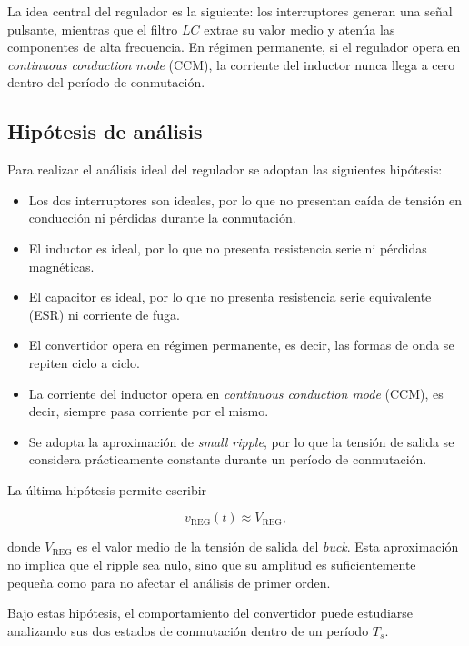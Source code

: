 \documentclass[a4paper,12pt]{article}
\begin{document}
La idea central del regulador es la siguiente: los interruptores generan una señal pulsante, mientras que el filtro $LC$ extrae su valor medio y atenúa las componentes de alta frecuencia. En régimen permanente, si el regulador opera en \textit{continuous conduction mode} (CCM), la corriente del inductor nunca llega a cero dentro del período de conmutación.

\subsection{Hipótesis de análisis}

Para realizar el análisis ideal del regulador se adoptan las siguientes hipótesis:

\begin{itemize}
    \item Los dos interruptores son ideales, por lo que no presentan caída de tensión en conducción ni pérdidas durante la conmutación.
    \item El inductor es ideal, por lo que no presenta resistencia serie ni pérdidas magnéticas.
    \item El capacitor es ideal, por lo que no presenta resistencia serie equivalente (ESR) ni corriente de fuga.
    \item El convertidor opera en régimen permanente, es decir, las formas de onda se repiten ciclo a ciclo.
    \item La corriente del inductor opera en \textit{continuous conduction mode} (CCM), es decir, siempre pasa corriente por el mismo.
    \item Se adopta la aproximación de \textit{small ripple}, por lo que la tensión de salida se considera prácticamente constante durante un período de conmutación.
\end{itemize}

La última hipótesis permite escribir

\begin{equation}
    v_\text{REG}(t) \approx V_\text{REG},
\end{equation}

donde $V_\text{REG}$ es el valor medio de la tensión de salida del \textit{buck}. Esta aproximación no implica que el ripple sea nulo, sino que su amplitud es suficientemente pequeña como para no afectar el análisis de primer orden.

Bajo estas hipótesis, el comportamiento del convertidor puede estudiarse analizando sus dos estados de conmutación dentro de un período $T_s$.
\end{document}
